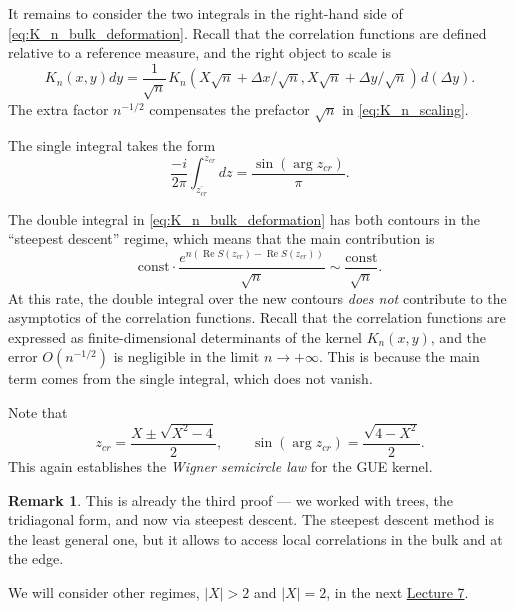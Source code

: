 \documentclass[letterpaper,11pt,oneside,reqno]{article}
\numberwithin{equation}{section}
\newcommand{\ssp}{\hspace{1pt}}
\theoremstyle{definition}
\newtheorem{remark}[proposition]{Remark}
\begin{document}
It remains to consider the two integrals in the right-hand side
of \eqref{eq:K_n_bulk_deformation}.
Recall that the correlation functions are
defined relative to a reference measure, and the right object to scale is
\begin{equation*}
	K_n(x,y)dy=\frac{1}{\sqrt n}
	\ssp
	K_n(X\sqrt n+\Delta x/\sqrt n,X\sqrt n+\Delta y/\sqrt n)
	\ssp d\left( \Delta y \right).
\end{equation*}
The extra factor $n^{-1/2}$
compensates the prefactor $\sqrt n$ in
\eqref{eq:K_n_scaling}.

The single integral takes the form
\begin{equation}
	\label{eq:K_n_bulk_single}
	\frac{-i}{2\pi}
	\int_{\overline{z_{cr}}}^{z_{cr}}
	dz
	=\frac{\sin(\arg z_{cr})}{\pi}.
\end{equation}

The double integral 
in \eqref{eq:K_n_bulk_deformation}
has both contours
in the ``steepest descent'' regime, which means that
the main contribution is
\begin{equation*}
	\mathrm{const}\cdot
	\frac{e^{n\left( \operatorname{Re}S(z_{cr})-\operatorname{Re}S(z_{cr}) \right)}}{\sqrt n}
	\sim \frac{\mathrm{const}}{\sqrt n}.
\end{equation*}
At this rate, the double integral over the new contours
\emph{does not} contribute to the asymptotics of the correlation functions.
Recall that the correlation functions are expressed as finite-dimensional
determinants of the kernel $K_n(x,y)$, and the error $O(n^{-1/2})$ is
negligible in the limit $n\to+\infty$.
This is because the main term comes from the single integral,
which does not vanish.

Note that
\begin{equation*}
	z_{cr}=\frac{X\pm \sqrt{X^2-4}}{2},
	\qquad 
	\sin(\arg z_{cr})=\frac{\sqrt{4-X^2}}{2}.
\end{equation*}
This again establishes the \emph{Wigner semicircle law} for the GUE kernel.

\begin{remark}
	This is already the third proof --- we worked with trees, the tridiagonal form, 
	and now via steepest descent. The steepest descent method is the least general one,
	but it allows to access local correlations in the bulk and at the edge.
\end{remark}

We will consider other regimes, $|X|>2$ and $|X|=2$, in the next 
\href{https://lpetrov.cc/rmt25/rmt25-notes/rmt2025-l07.pdf}{Lecture 7}.
\end{document}
